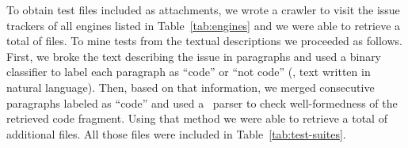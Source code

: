 \documentclass[smallextended]{svjour3}
\begin{document}
To obtain test files included as attachments, we wrote a crawler to
visit the issue trackers of all engines listed in
Table~\ref{tab:engines} and we were able to retrieve a total of
\filesAttached{} files.  To mine tests from the textual descriptions we
proceeded as follows. First, we broke the text describing the issue in
paragraphs and used a binary classifier to label each paragraph as
``code'' or ``not code'' (\ie{}, text written in natural language). Then, based on
that information, we merged consecutive paragraphs labeled as ``code''
and used a \js\ parser to check well-formedness of the retrieved code
fragment. Using that method we were able to retrieve a total of
\filesMining{} additional files. All those files were included in
Table~\ref{tab:test-suites}.

\end{document}
